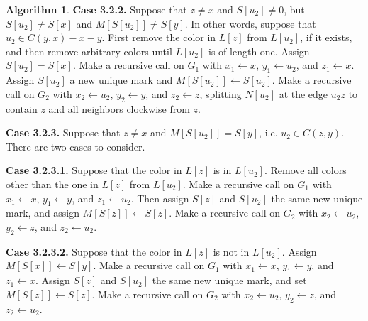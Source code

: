 \documentclass[12pt,letterpaper]{article}
\theoremstyle{plain}
\theoremstyle{definition}
\theoremstyle{break}
\newtheorem{algorithm}[lemma]{Algorithm}     %
\begin{document}
\begin{algorithm}
\textbf{Case 3.2.2.} Suppose that $z\ne x$ and $S[u_2]\ne 0$, but
$S[u_2]\ne S[x]$ and $M[S[u_2]]\ne S[y]$. In other words, suppose that $u_2\in C(y,x)-x-y$.
First remove the color in $L[z]$ from $L[u_2]$, if it exists, and then remove
arbitrary colors until $L[u_2]$ is of length one. Assign $S[u_2]=S[x]$.
Make a recursive call on $G_1$ with $x_1\leftarrow x$,
$y_1\leftarrow u_2$, and $z_1\leftarrow x$.
Assign $S[u_2]$ a new unique mark and $M[S[u_2]]\leftarrow S[u_2]$.
Make a recursive call on $G_2$
with $x_2\leftarrow u_2$, $y_2\leftarrow y$, and $z_2\leftarrow z$,
splitting $N[u_2]$ at the edge $u_2z$ to contain $z$ and all neighbors clockwise
from $z$.

\textbf{Case 3.2.3.} Suppose that $z\ne x$ and $M[S[u_2]]=S[y]$, i.e.
$u_2\in C(z,y)$. There are
two cases to consider.

\textbf{Case 3.2.3.1.} Suppose that the color in $L[z]$ is in $L[u_2]$. Remove
all colors other than the one in $L[z]$ from $L[u_2]$.
Make a recursive call on $G_1$ with $x_1\leftarrow x$,
$y_1\leftarrow y$, and $z_1\leftarrow u_2$.
Then assign $S[z]$ and $S[u_2]$ the same new unique mark, and assign
$M[S[z]]\leftarrow S[z]$. Make a
recursive call on $G_2$ with $x_2\leftarrow u_2$, $y_2\leftarrow z$,
and $z_2\leftarrow u_2$.

\textbf{Case 3.2.3.2.} Suppose that the color in $L[z]$ is not in $L[u_2]$.
Assign $M[S[x]]\leftarrow S[y]$. Make a recursive call on $G_1$
with $x_1\leftarrow x$,
$y_1\leftarrow y$, and $z_1\leftarrow x$.
Assign $S[z]$ and $S[u_2]$ the same new unique mark, and
set $M[S[z]]\leftarrow S[z]$. Make a
recursive call on $G_2$ with $x_2\leftarrow u_2$, $y_2\leftarrow z$,
and $z_2\leftarrow u_2$.
\end{algorithm}
\end{document}
